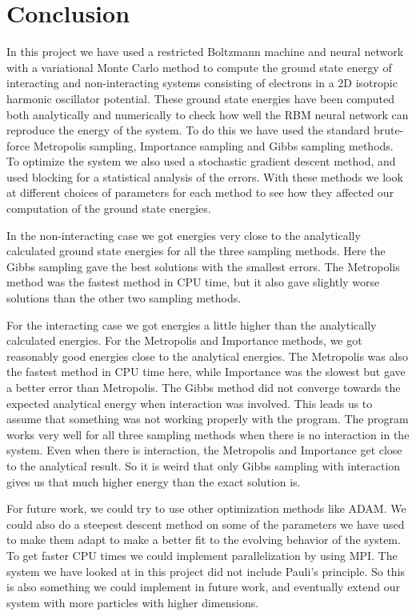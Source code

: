 \documentclass[12pt,a4paper,english]{article}
\begin{document}
\section{Conclusion}
\label{sect:Conclusion}
In this project we have used a restricted Boltzmann machine and neural network with a variational Monte Carlo method to compute the ground state energy of interacting and non-interacting systems consisting of electrons in a 2D isotropic harmonic oscillator potential. These ground state energies have been computed both analytically and numerically to check how well the RBM neural network can reproduce the energy of the system. To do this we have used the standard brute-force Metropolis sampling, Importance sampling and Gibbs sampling methods. To optimize the system we also used a stochastic gradient descent method, and used blocking for a statistical analysis of the errors. With these methods we look at different choices of parameters for each method to see how they affected our computation of the ground state energies.

In the non-interacting case we got energies very close to the analytically calculated ground state energies for all the three sampling methods. Here the Gibbs sampling gave the best solutions with the smallest errors. The Metropolis method was the fastest method in CPU time, but it also gave slightly worse solutions than the other two sampling methods.

For the interacting case we got energies a little higher than the analytically calculated energies. For the Metropolis and Importance methods, we got reasonably good energies close to the analytical energies. The Metropolis was also the fastest method in CPU time here, while Importance was the slowest but gave a better error than Metropolis. The Gibbs method did not converge towards the expected analytical energy when interaction was involved. This leads us to assume that something was not working properly with the program. The program works very well for all three sampling methods when there is no interaction in the system. Even when there is interaction, the Metropolis and Importance get close to the analytical result. So it is weird that only Gibbs sampling with interaction gives us that much higher energy than the exact solution is.

For future work, we could try to use other optimization methods like ADAM. We could also do a steepest descent method on some of the parameters we have used to make them adapt to make a better fit to the evolving behavior of the system. To get faster CPU times we could implement parallelization by using MPI. The system we have looked at in this project did not include Pauli's principle. So this is also something we could implement in future work, and eventually extend our system with more particles with higher dimensions.
\end{document}

